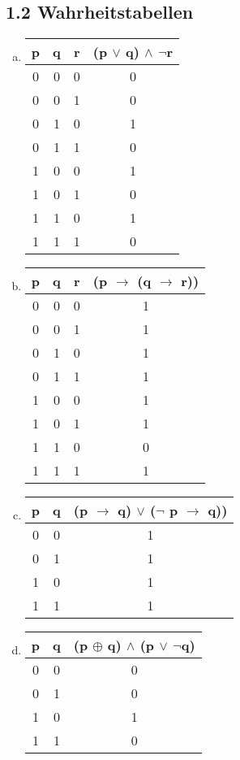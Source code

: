 \documentclass[12pt,a4paper]{article}
\begin{document}
\subsection*{1.2 Wahrheitstabellen}
\begin{enumerate}[a)]
\item 
\begin{tabular}{c|c|c|c}
p & q & r & (p $\lor$ q) $\land$ $\neg$r\\
\hline
0 & 0 & 0 & 0 \\
0 & 0 & 1 & 0 \\
0 & 1 & 0 & 1 \\
0 & 1 & 1 & 0 \\
1 & 0 & 0 & 1 \\
1 & 0 & 1 & 0 \\
1 & 1 & 0 & 1 \\
1 & 1 & 1 & 0 \\
\end{tabular}

\item
\begin{tabular}{c|c|c|c}
p & q & r & (p  $\rightarrow$ (q $\rightarrow$ r))\\
\hline
0 & 0 & 0 & 1\\
0 & 0 & 1 & 1\\
0 & 1 & 0 & 1\\
0 & 1 & 1 & 1\\
1 & 0 & 0 & 1 \\
1 & 0 & 1 & 1\\
1 & 1 & 0 & 0 \\
1 & 1 & 1 & 1\\
\end{tabular}

\item
\begin{tabular}{c|c|c}
p & q & (p  $\rightarrow$ q) $\lor$ ($\neg$ p $\rightarrow$ q))\\
\hline
0 & 0 & 1\\
0 & 1 & 1\\
1 & 0 & 1\\
1 & 1 & 1\\
\end{tabular}

\item
\begin{tabular}{c|c|c}
p & q & (p $\oplus$ q) $\land$ (p $\lor$ $\neg$q)\\
\hline
0 & 0 & 0\\
0 & 1 & 0\\
1 & 0 & 1\\
1 & 1 & 0\\
\end{tabular}
\end{enumerate}
\end{document}
